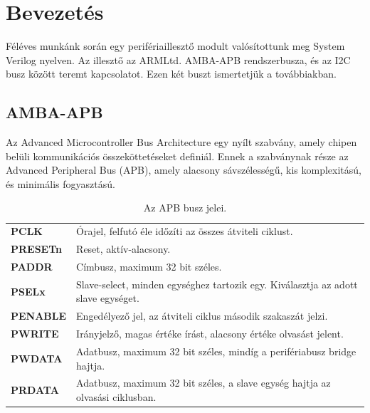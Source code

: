 \chapter{Bevezetés}
\label{sec:intro}

Féléves munkánk során egy perifériaillesztő modult valósítottunk meg System Verilog nyelven. Az illesztő az ARM\texttrademark Ltd. AMBA\texttrademark-APB rendszerbusza, és az I2C busz között teremt kapcsolatot. Ezen két buszt ismertetjük a továbbiakban.

\section{AMBA-APB}{
    Az Advanced Microcontroller Bus Architecture egy nyílt szabvány, amely chipen belüli kommunikációs összeköttetéseket definiál. Ennek a szabványnak része az Advanced Peripheral Bus (APB), amely alacsony sávszélességű, kis komplexitású, és minimális fogyasztású.

    \begin{table}[ht!]
        \begin{tabular}{l|p{}}
            \textbf{PCLK}       & Órajel, felfutó éle időzíti az összes átviteli ciklust. \\[3ex]
            \textbf{PRESETn}    & Reset, aktív-alacsony. \\[3ex]
            \textbf{PADDR}      & Címbusz, maximum 32 bit széles. \\[3ex]
            \textbf{PSELx}      & Slave-select, minden egységhez tartozik egy. Kiválasztja az adott slave egységet. \\[3ex]
            \textbf{PENABLE}    & Engedélyező jel, az átviteli ciklus második szakaszát jelzi. \\[3ex]
            \textbf{PWRITE}     & Irányjelző, magas értéke írást, alacsony értéke olvasást jelent. \\[3ex]
            \textbf{PWDATA}     & Adatbusz, maximum 32 bit széles, mindíg a perifériabusz bridge hajtja. \\[3ex]
            \textbf{PRDATA}     & Adatbusz, maximum 32 bit széles, a slave egység hajtja az olvasási ciklusban.
        \end{tabular}
        \caption{Az APB busz jelei.}
        \label{tab:APBsig}
    \end{table}

}
